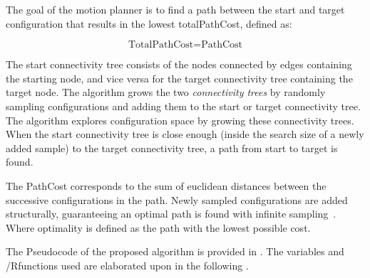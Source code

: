 The goal of the motion planner is to find a path between the start and target configuration that results in the lowest totalPathCost, defined as:



\[\textrm{TotalPathCost} = \textrm{PathCost}\]

The start connectivity tree consists of the nodes connected by edges containing the starting node, and vice versa for the target connectivity tree containing the target node. The algorithm grows the two \textit{connectivity trees} by randomly sampling configurations and adding them to the start or target connectivity tree. The algorithm explores configuration space by growing these connectivity trees. When the start connectivity tree is close enough (inside the search size of a newly added sample) to the target connectivity tree, a path from start to target is found. 




The PathCost corresponds to the sum of euclidean distances between the successive configurations in the path. Newly sampled configurations are added structurally, guaranteeing an optimal path is found with infinite sampling~\cite{chen_fast_2018}. Where optimality is defined as the path with the lowest possible cost.\bs



The Pseudocode of the proposed algorithm is provided in . The variables and /Rfunctions used are elaborated upon in the following .\bs



